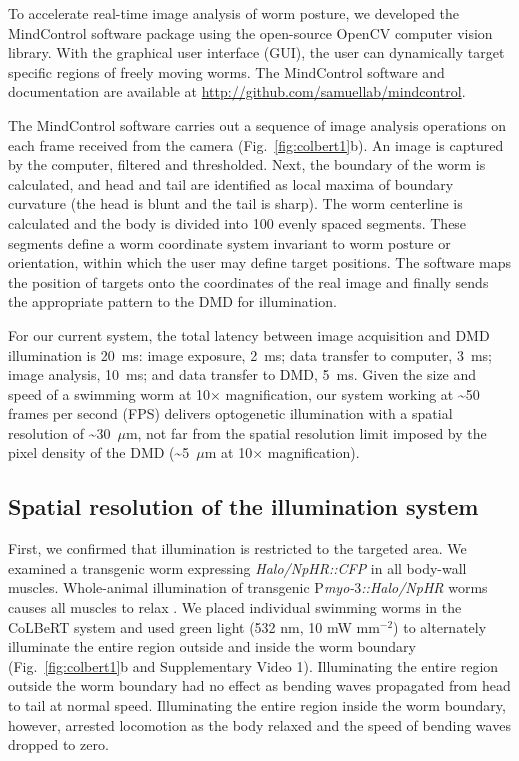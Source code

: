 \begin{FPfigure}
\end{FPfigure}

To accelerate real-time image analysis of worm posture, we developed the MindControl software package using the open-source OpenCV computer vision library\citep{bradski_opencv_2000}. With the graphical user interface (GUI), the user can dynamically target specific regions of freely moving worms. The MindControl software and documentation are available at \href{http://github.com/samuellab/mindcontrol}{http://github.com/samuellab/mindcontrol}.


The MindControl software carries out a sequence of image analysis operations on each frame received from the camera (Fig.~\ref{fig:colbert1}b). An image is captured by the computer, filtered and thresholded. Next, the boundary of the worm is calculated, and head and tail are identified as local maxima of boundary curvature (the head is blunt and the tail is sharp). The worm centerline is calculated and the body is divided into 100 evenly spaced segments. These segments define a worm coordinate system invariant to worm posture or orientation, within which the user may define target positions. The software maps the position of targets onto the coordinates of the real image and finally sends the appropriate pattern to the DMD for illumination.

For our current system, the total latency between image acquisition and DMD illumination is 20~ms: image exposure, 2~ms; data transfer to computer, 3~ms; image analysis, 10~ms; and data transfer to DMD, 5~ms. Given the size and speed of a swimming worm at 10× magnification, our system working at \textasciitilde50 frames per second (FPS) delivers optogenetic illumination with a spatial resolution of \textasciitilde30~$\mu$m, not far from the spatial resolution limit imposed by the pixel density of the DMD (\textasciitilde5~$\mu$m at 10× magnification).

\subsection{Spatial resolution of the illumination system}
First, we confirmed that illumination is restricted to the targeted area. We examined a transgenic worm expressing \textit{Halo/NpHR::CFP} in all body-wall muscles. Whole-animal illumination of transgenic P\textit{myo-$3$::Halo/NpHR} worms causes all muscles to relax \citep{zhang_multimodal_2007}. We placed individual swimming worms in the CoLBeRT system and used green light (532 nm, 10 mW mm$^{-2}$) to alternately illuminate the entire region outside and inside the worm boundary (Fig.~\ref{fig:colbert1}b and Supplementary Video 1). Illuminating the entire region outside the worm boundary had no effect as bending waves propagated from head to tail at normal speed. Illuminating the entire region inside the worm boundary, however, arrested locomotion as the body relaxed and the speed of bending waves dropped to zero.

